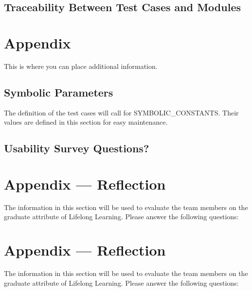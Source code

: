 \documentclass[12pt, titlepage]{article}
\begin{document}
	\subsection{Traceability Between Test Cases and Modules}
	
	
	
	
	
	
	\newpage
	
	\section{Appendix}
	
	This is where you can place additional information.
	
	\subsection{Symbolic Parameters}
	
	The definition of the test cases will call for SYMBOLIC\_CONSTANTS.
	Their values are defined in this section for easy maintenance.
	
	\subsection{Usability Survey Questions?}
	
	
	\newpage{}
	\section*{Appendix --- Reflection}
	
	The information in this section will be used to evaluate the team members 
	on the
	graduate attribute of Lifelong Learning.  Please answer the following 
	questions:
	
	\newpage{}
	\section*{Appendix --- Reflection}
	
	The information in this section will be used to evaluate the team members 
	on the
	graduate attribute of Lifelong Learning.  Please answer the following 
	questions:
	
\end{document}
